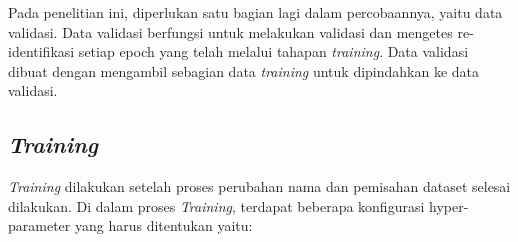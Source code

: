 

Pada penelitian ini, diperlukan satu bagian lagi dalam percobaannya, yaitu data validasi. 
Data validasi berfungsi untuk melakukan validasi dan mengetes re-identifikasi setiap epoch yang telah 
melalui tahapan \emph{training}. Data validasi dibuat dengan mengambil sebagian data \emph{training} 
untuk dipindahkan ke data validasi. \\



\subsection{\emph{Training}}

\emph{Training} dilakukan setelah proses perubahan nama dan pemisahan dataset selesai \linebreak dilakukan. 
Di dalam proses \emph{Training}, terdapat beberapa konfigurasi hyper-parameter yang harus 
ditentukan yaitu:

